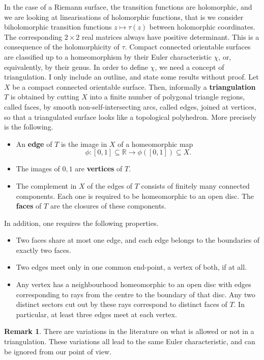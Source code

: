 \documentclass{article}
\newcommand{\R}{\mathbb{R}}
\newcommand{\rb}[1]{\left( #1 \right)}
\renewcommand{\sb}[1]{\left[ #1 \right]}
\theoremstyle{definition}\newtheorem{definition}{Definition}[section]
\theoremstyle{definition}\newtheorem{notation}[definition]{Notation}
\theoremstyle{definition}\newtheorem{remark}[definition]{Remark}
\theoremstyle{definition}\newtheorem{example1}[definition]{Example}
\theoremstyle{definition}\newtheorem{fact}{Fact}
\theoremstyle{definition}\newtheorem{exercise}{Exercise}
\theoremstyle{definition}\newtheorem*{example2}{Example}
\begin{document}
In the case of a Riemann surface, the transition functions are holomorphic, and we are looking at linearisations of holomorphic functions, that is we consider biholomorphic transition functions $ z \mapsto \tau\rb{z} $ between holomorphic coordinates. The corresponding $ 2 \times 2 $ real matrices always have positive determinant. This is a consequence of the holomorphicity of $ \tau $. Compact connected orientable surfaces are classified up to a homeomorphism by their Euler characteristic $ \chi $, or, equivalently, by their genus. In order to define $ \chi $, we need a concept of triangulation. I only include an outline, and state some results without proof. Let $ X $ be a compact connected orientable surface. Then, informally a \textbf{triangulation} $ T $ is obtained by cutting $ X $ into a finite number of polygonal triangle regions, called faces, by smooth non-self-intersecting arcs, called edges, joined at vertices, so that a triangulated surface looks like a topological polyhedron. More precisely is the following.
\begin{itemize}
\item An \textbf{edge} of $ T $ is the image in $ X $ of a homeomorphic map
$$ \phi : \sb{0, 1} \subseteq \R \to \phi\rb{\sb{0, 1}} \subseteq X. $$
\item The images of $ 0, 1 $ are \textbf{vertices} of $ T $.
\item The complement in $ X $ of the edges of $ T $ consists of finitely many connected components. Each one is required to be homeomorphic to an open disc. The \textbf{faces} of $ T $ are the closures of these components.
\end{itemize}
In addition, one requires the following properties.
\begin{itemize}
\item Two faces share at most one edge, and each edge belongs to the boundaries of exactly two faces.
\item Two edges meet only in one common end-point, a vertex of both, if at all.
\item Any vertex has a neighbourhood homeomorphic to an open disc with edges corresponding to rays from the centre to the boundary of that disc. Any two distinct sectors cut out by these rays correspond to distinct faces of $ T $. In particular, at least three edges meet at each vertex.
\end{itemize}

\begin{remark}
There are variations in the literature on what is allowed or not in a triangulation. These variations all lead to the same Euler characteristic, and can be ignored from our point of view.
\end{remark}
\end{document}
